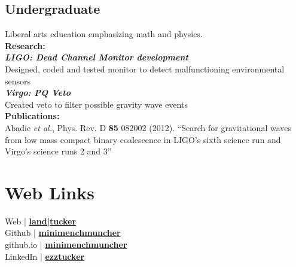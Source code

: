 \documentclass[]{deedy-resume-openfont}
\begin{document}
\begin{minipage}[t]{0.33\textwidth}
\subsection{Undergraduate}
Liberal arts education emphasizing math and physics. \\
{\footnotesize {\textbf{Research:}}}\\
{\footnotesize \textit{\textbf{LIGO: Dead Channel Monitor development}}}\\
Designed, coded and tested monitor to detect malfunctioning environmental sensors\\
{\footnotesize \textit{\textbf{Virgo: PQ Veto}}}\\
Created veto to filter possible gravity wave events\\
{\footnotesize {\textbf{Publications:}}}\\
Abadie \emph{et al.}, Phys. Rev. D {\bf 85} 082002 (2012). ``Search for gravitational waves from low mass compact binary coalescence in LIGO's sixth science run and Virgo's science runs 2 and 3''\\
\sectionsep



\section{Web Links}
Web | \href{https://landtucker.wordpress.com/about-ezra}{\bf land|tucker}\\
Github | \href{https://github.com/minimenchmuncher}{\bf minimenchmuncher} \\
github.io | \href{https://minimenchmuncher.github.io}{\bf minimenchmuncher}\\
LinkedIn |  \href{https://www.linkedin.com/in/ezztucker}{\bf ezztucker} 
\sectionsep

%
%

\end{minipage} 
\hfill
\end{document}

